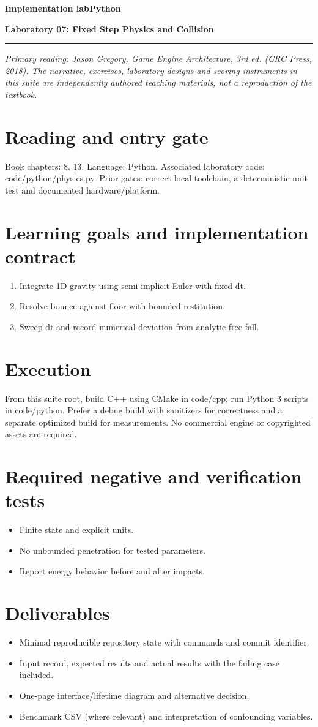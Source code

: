 \documentclass[11pt,letterpaper]{article}
\newcommand{\DocType}{Reference}
\newcommand{\SuiteHeading}[3]{%
\renewcommand{\DocType}{#2}%
{\small\bfseries\sffamily\color{EngineTeal}#2\hfill #3}\par\vspace{6pt}
{\LARGE\bfseries\color{EngineBlue}#1}\par\vspace{4pt}
{\color{EngineTeal}\rule{\linewidth}{1pt}}\par\vspace{7pt}}
\newcommand{\SourceNote}{\footnotesize\textit{Primary reading: Jason Gregory, \emph{Game Engine Architecture}, 3rd ed. (CRC Press, 2018). The narrative, exercises, laboratory designs and scoring instruments in this suite are independently authored teaching materials, not a reproduction of the textbook.}\normalsize\par}
\begin{document}
\SuiteHeading{Laboratory 07: Fixed Step Physics and Collision}{Implementation lab}{Python}
\SourceNote
\section{Reading and entry gate}
Book chapters: 8, 13. Language: Python. Associated laboratory code: code/python/physics.py. Prior gates: correct local toolchain, a deterministic unit test and documented hardware/platform.

\section{Learning goals and implementation contract}
\begin{enumerate}
\item Integrate 1D gravity using semi-implicit Euler with fixed dt.
\item Resolve bounce against floor with bounded restitution.
\item Sweep dt and record numerical deviation from analytic free fall.
\end{enumerate}
\section{Execution}
From this suite root, build C++ using CMake in code/cpp; run Python 3 scripts in code/python. Prefer a debug build with sanitizers for correctness and a separate optimized build for measurements. No commercial engine or copyrighted assets are required.

\section{Required negative and verification tests}
\begin{itemize}
\item Finite state and explicit units.
\item No unbounded penetration for tested parameters.
\item Report energy behavior before and after impacts.
\end{itemize}
\section{Deliverables}
\begin{itemize}
\item Minimal reproducible repository state with commands and commit identifier.
\item Input record, expected results and actual results with the failing case included.
\item One-page interface/lifetime diagram and alternative decision.
\item Benchmark CSV (where relevant) and interpretation of confounding variables.
\end{itemize}
\end{document}
